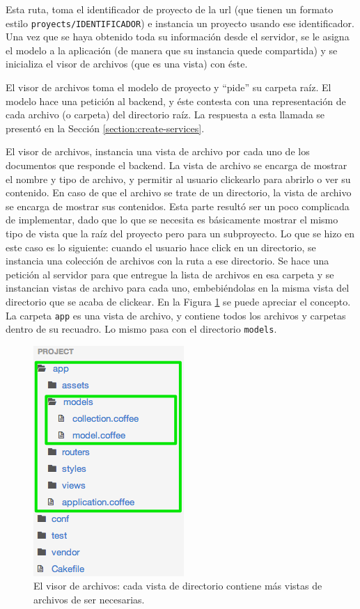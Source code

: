 \documentclass[12pt,titlepage,]{article}
\makeatletter
\def\maxwidth{\ifdim\Gin@nat@width>\linewidth\linewidth
\else\Gin@nat@width\fi}
\let\Oldincludegraphics\includegraphics
\renewcommand{\includegraphics}[1]{\Oldincludegraphics[width=\maxwidth]{#1}}
\makeatother
\begin{document}
Esta ruta, toma el identificador de proyecto de la url (que tienen un
formato estilo \texttt{proyects/IDENTIFICADOR}) e instancia un proyecto
usando ese identificador. Una vez que se haya obtenido toda su
información desde el servidor, se le asigna el modelo a la aplicación
(de manera que su instancia quede compartida) y se inicializa el visor
de archivos (que es una vista) con éste.

El visor de archivos toma el modelo de proyecto y ``pide'' su carpeta
raíz. El modelo hace una petición al backend, y éste contesta con una
representación de cada archivo (o carpeta) del directorio raíz. La
respuesta a esta llamada se presentó en la Sección
\ref{section:create-services}.

El visor de archivos, instancia una vista de archivo por cada uno de los
documentos que responde el backend. La vista de archivo se encarga de
mostrar el nombre y tipo de archivo, y permitir al usuario clickearlo
para abrirlo o ver su contenido. En caso de que el archivo se trate de
un directorio, la vista de archivo se encarga de mostrar sus contenidos.
Esta parte resultó ser un poco complicada de implementar, dado que lo
que se necesita es básicamente mostrar el mismo tipo de vista que la
raíz del proyecto pero para un subproyecto. Lo que se hizo en este caso
es lo siguiente: cuando el usuario hace click en un directorio, se
instancia una colección de archivos con la ruta a ese directorio. Se
hace una petición al servidor para que entregue la lista de archivos en
esa carpeta y se instancian vistas de archivo para cada uno,
embebiéndolas en la misma vista del directorio que se acaba de clickear.
En la Figura \ref{figure:file-browser} se puede apreciar el concepto. La
carpeta \texttt{app} es una vista de archivo, y contiene todos los
archivos y carpetas dentro de su recuadro. Lo mismo pasa con el
directorio \texttt{models}.

\begin{figure}[htbp]
\centering
\includegraphics{figures/file-browser.png}
\caption{El visor de archivos: cada vista de directorio contiene más
vistas de archivos de ser necesarias. \label{figure:file-browser}}
\end{figure}
\end{document}
